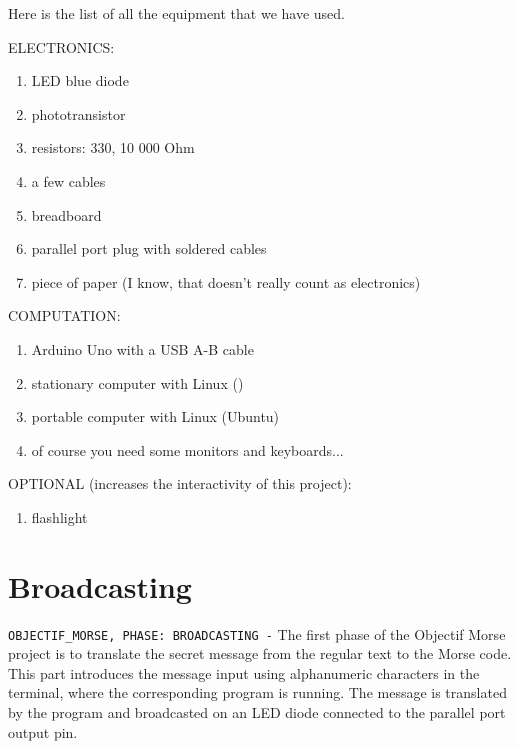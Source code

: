 \documentclass[12pt]{report}
\begin{document}
Here is the list of all the equipment that we have used.

ELECTRONICS:

\begin{enumerate}

\item LED blue diode
\item phototransistor
\item resistors: 330, 10 000 Ohm
\item a few cables
\item breadboard
\item parallel port plug with soldered cables
\item piece of paper (I know, that doesn't really count as electronics)

\end{enumerate}

COMPUTATION:

\begin{enumerate}

\item Arduino Uno with a USB A-B cable
\item stationary computer with Linux ()
\item portable computer with Linux (Ubuntu)
\item of course you need some monitors and keyboards...

\end{enumerate}

OPTIONAL (increases the interactivity of this project):

\begin{enumerate}

\item flashlight

\end{enumerate}





\newpage

\chapter{Broadcasting}

\verb|OBJECTIF_MORSE, PHASE: BROADCASTING -| The first phase of the Objectif Morse project is to translate the secret message from the regular text to the Morse code. This part introduces the message input using alphanumeric characters in the terminal, where the corresponding program is running. The message is translated by the program and broadcasted on an LED diode connected to the parallel port output pin.
\end{document}
